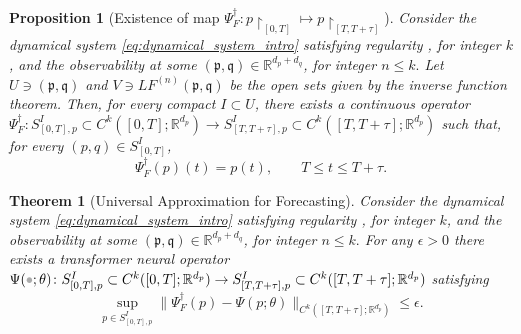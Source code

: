 \documentclass[10pt,a4paper]{amsart}
\newtheorem{proposition}{Proposition}
\newtheorem{theorem}{Theorem}
\newcommand{\R}{\mathbbm{R}}
\newcommand{\fp}{\mathfrak{p}}
\newcommand{\fq}{\mathfrak{q}}
\providecommand{\mathbbm}{\mathbb} %
\newcommand{\placeholder}{\mathord{\color{black!33}\bullet}}
\begin{document}
\begin{proposition}[Existence of map $\Psi_F^\dagger:p \!\restriction_{[0,T]}\mapsto p \!\restriction_{[T,T+\tau]}$]
\label{prop:psiF}
Consider the dynamical system \eqref{eq:dynamical_system_intro} satisfying 
regularity , for integer $k$, and the observability  at some $(\mathfrak{p},\mathfrak{q})\in\R^{d_p + d_q}$, for integer $n \le k.$
Let $ U \ni (\fp, \fq)$ and $V \ni LF^{(n)}(\fp, \fq)$ be the open sets given by the inverse function theorem. 
Then, for every compact $I \subset U$, there exists a continuous operator $\Psi_F^\dagger \colon S^I_{[0,T],p} \subset C^k([0,T];\R^{d_p}) \to S^I_{[T,T+\tau],p} \subset C^k([T, T+\tau]; \R^{d_p})$ such that, for every $(p, q) \in S^I_{[0,T]}$,
\begin{equation}
    \label{eq:p_to_q_map3}
    \Psi_F^\dagger(p)(t) = p(t), \qquad T\leq t\leq T+\tau.
\end{equation}
\end{proposition}

\begin{theorem}[Universal Approximation for Forecasting]
\label{thm:UAforecasting}
Consider the dynamical system \eqref{eq:dynamical_system_intro} satisfying
regularity , for integer $k$, and the observability  at some $(\mathfrak{p},\mathfrak{q})\in\R^{d_p + d_q}$, for integer $n \le k.$ For any $\epsilon > 0$ there exists a transformer neural operator $\Psi(\placeholder;\theta)\colon S^I_{[0,T],p} \subset C^k ([0,T];\R^{d_p}) \to S^I_{[T,T+\tau],p} \subset C^k ([T,T+\tau];\R^{d_p})$ satisfying
\[\sup_{p \in S^I_{[0,T],p}} \|\Psi_F^\dagger(p) - \Psi(p;\theta)\|_{C^k([T,T+\tau];\R^{d_p})} \leq \epsilon. \]
\end{theorem}
\end{document}
